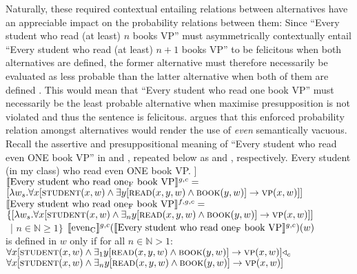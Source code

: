 Naturally, these required contextual entailing relations between alternatives have an appreciable impact on the probability relations between them: Since \enquote{Every student who read (at least) $n$ books VP} must asymmetrically contextually entail \enquote{Every student who read (at least) $n+1$ books VP} to be felicitous when both alternatives are defined, the former alternative must therefore necessarily be evaluated as less probable than the latter alternative \parencite{Kolmogorov1933} when both of them are defined \parencite[p.~135]{Crnic2014-dogma}. This would mean that \enquote{Every student who read one book VP} must necessarily be the least probable alternative when maximise presupposition is not violated and thus the sentence is felicitous. \textcite{Crnic2014-dogma} argues that this enforced probability relation amongst alternatives would render the use of \textit{even} semantically vacuous. Recall the assertive and presuppositional meaning of \enquote{Every student who read even \MakeUppercase{one} book VP} in  and , repeated below as  and , respectively.
\pex\label{ex:even-sdm-demo-repeat2}
\a Every student (in my class) who read even \MakeUppercase{one} book VP.
\a[] [even\textsubscript{C} [every student who read one\textsubscript{F} book VP]]
\a $\intension[g,c]{Every student who read one\textsubscript{F} book VP}=$\\\emptyfill$[\lambda{w_s}.\forall{x}[\predicate{student}(x,w)\land\exists{y}[\predicate{read}(x,y,w)\land\predicate{book}(y,w)]\rightarrow\predicate{vp}(x,w)]]$
\a $\intension[f,g,c]{Every student who read one\textsubscript{F} book VP}=$\\$\{[\lambda{w_s}.\forall{x}[\predicate{student}(x,w)\land\exists_n{y}[\predicate{read}(x,y,w)\land\predicate{book}(y,w)]\rightarrow\predicate{vp}(x,w)]]$\\\emptyfill~| $n\in\mathbb{N}\geqslant1\}$
\a $\intension[g,c]{even\textsubscript{C}}(\intension[g,c]{Every student who read one\textsubscript{F} book VP})(w)$\\is defined in $w$ only if for all $n\in\mathbb{N}>1$:\\$\forall{x}[\predicate{student}(x,w)\land\exists_1{y}[\predicate{read}(x,y,w)\land\predicate{book}(y,w)]\rightarrow\predicate{vp}(x,w)]\lprob_c$\\\emptyfill$\forall{x}[\predicate{student}(x,w)\land\exists_n{y}[\predicate{read}(x,y,w)\land\predicate{book}(y,w)]\rightarrow\predicate{vp}(x,w)]$
